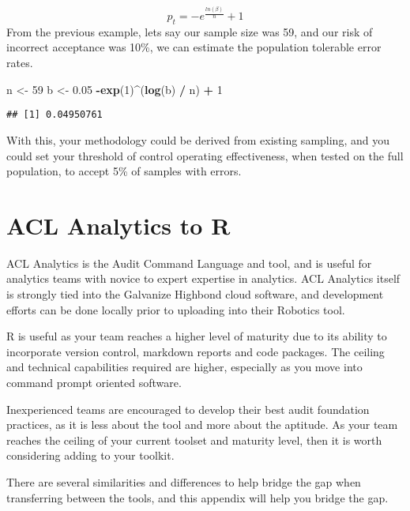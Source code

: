 \documentclass[
]{book}
\newenvironment{Shaded}{\begin{snugshade}}{\end{snugshade}}
\newcommand{\DecValTok}[1]{\textcolor[rgb]{0.00,0.00,0.81}{#1}}
\newcommand{\FloatTok}[1]{\textcolor[rgb]{0.00,0.00,0.81}{#1}}
\newcommand{\KeywordTok}[1]{\textcolor[rgb]{0.13,0.29,0.53}{\textbf{#1}}}
\newcommand{\NormalTok}[1]{#1}
\newcommand{\OperatorTok}[1]{\textcolor[rgb]{0.81,0.36,0.00}{\textbf{#1}}}
\newcommand{\StringTok}[1]{\textcolor[rgb]{0.31,0.60,0.02}{#1}}
\begin{document}
\[
p_{t} = -e^\frac{ln(\beta)}{n} + 1
\]
From the previous example, lets say our sample size was 59, and our risk of incorrect acceptance was 10\%, we can estimate the population tolerable error rates.

\begin{Shaded}
\begin{Highlighting}[]
\NormalTok{n <-}\StringTok{ }\DecValTok{59}
\NormalTok{b <-}\StringTok{ }\FloatTok{0.05}
\OperatorTok{-}\KeywordTok{exp}\NormalTok{(}\DecValTok{1}\NormalTok{)}\OperatorTok{^}\NormalTok{(}\KeywordTok{log}\NormalTok{(b) }\OperatorTok{/}\StringTok{ }\NormalTok{n) }\OperatorTok{+}\StringTok{ }\DecValTok{1}
\end{Highlighting}
\end{Shaded}

\begin{verbatim}
## [1] 0.04950761
\end{verbatim}

With this, your methodology could be derived from existing sampling, and you could set your threshold of control operating effectiveness, when tested on the full population, to accept 5\% of samples with errors.

\hypertarget{acl-analytics-to-r}{%
\chapter{ACL Analytics to R}\label{acl-analytics-to-r}}

ACL Analytics is the Audit Command Language and tool, and is useful for analytics teams with novice to expert expertise in analytics. ACL Analytics itself is strongly tied into the Galvanize Highbond cloud software, and development efforts can be done locally prior to uploading into their Robotics tool.

R is useful as your team reaches a higher level of maturity due to its ability to incorporate version control, markdown reports and code packages. The ceiling and technical capabilities required are higher, especially as you move into command prompt oriented software.

Inexperienced teams are encouraged to develop their best audit foundation practices, as it is less about the tool and more about the aptitude. As your team reaches the ceiling of your current toolset and maturity level, then it is worth considering adding to your toolkit.

There are several similarities and differences to help bridge the gap when transferring between the tools, and this appendix will help you bridge the gap.
\end{document}
